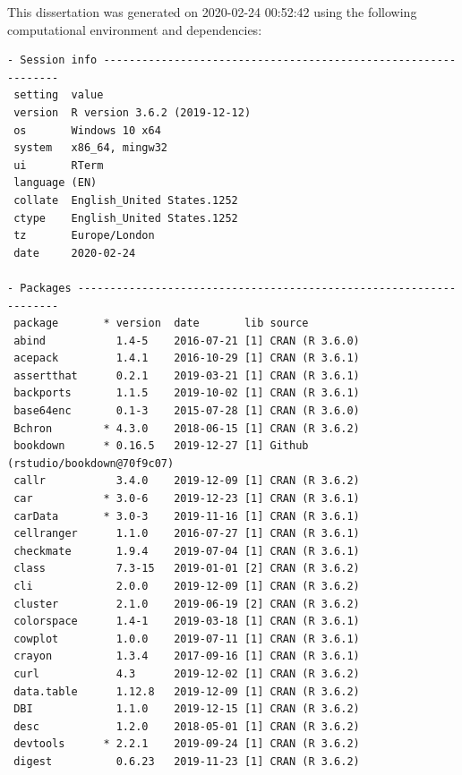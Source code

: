 \documentclass[12pt,twoside]{reedthesis}
\begin{document}
This dissertation was generated on 2020-02-24 00:52:42 using the following computational environment and dependencies:
\begin{verbatim}
- Session info ---------------------------------------------------------------
 setting  value                       
 version  R version 3.6.2 (2019-12-12)
 os       Windows 10 x64              
 system   x86_64, mingw32             
 ui       RTerm                       
 language (EN)                        
 collate  English_United States.1252  
 ctype    English_United States.1252  
 tz       Europe/London               
 date     2020-02-24                  

- Packages -------------------------------------------------------------------
 package       * version  date       lib source                            
 abind           1.4-5    2016-07-21 [1] CRAN (R 3.6.0)                    
 acepack         1.4.1    2016-10-29 [1] CRAN (R 3.6.1)                    
 assertthat      0.2.1    2019-03-21 [1] CRAN (R 3.6.1)                    
 backports       1.1.5    2019-10-02 [1] CRAN (R 3.6.1)                    
 base64enc       0.1-3    2015-07-28 [1] CRAN (R 3.6.0)                    
 Bchron        * 4.3.0    2018-06-15 [1] CRAN (R 3.6.2)                    
 bookdown      * 0.16.5   2019-12-27 [1] Github (rstudio/bookdown@70f9c07) 
 callr           3.4.0    2019-12-09 [1] CRAN (R 3.6.2)                    
 car           * 3.0-6    2019-12-23 [1] CRAN (R 3.6.1)                    
 carData       * 3.0-3    2019-11-16 [1] CRAN (R 3.6.1)                    
 cellranger      1.1.0    2016-07-27 [1] CRAN (R 3.6.1)                    
 checkmate       1.9.4    2019-07-04 [1] CRAN (R 3.6.1)                    
 class           7.3-15   2019-01-01 [2] CRAN (R 3.6.2)                    
 cli             2.0.0    2019-12-09 [1] CRAN (R 3.6.2)                    
 cluster         2.1.0    2019-06-19 [2] CRAN (R 3.6.2)                    
 colorspace      1.4-1    2019-03-18 [1] CRAN (R 3.6.1)                    
 cowplot         1.0.0    2019-07-11 [1] CRAN (R 3.6.1)                    
 crayon          1.3.4    2017-09-16 [1] CRAN (R 3.6.1)                    
 curl            4.3      2019-12-02 [1] CRAN (R 3.6.2)                    
 data.table      1.12.8   2019-12-09 [1] CRAN (R 3.6.2)                    
 DBI             1.1.0    2019-12-15 [1] CRAN (R 3.6.2)                    
 desc            1.2.0    2018-05-01 [1] CRAN (R 3.6.2)                    
 devtools      * 2.2.1    2019-09-24 [1] CRAN (R 3.6.2)                    
 digest          0.6.23   2019-11-23 [1] CRAN (R 3.6.2)                    

\end{verbatim}
\end{document}
